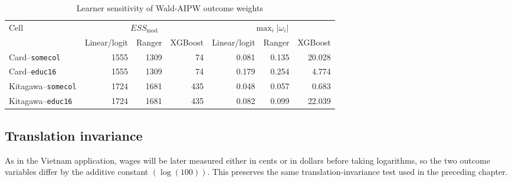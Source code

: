 \documentclass[12pt, a4paper, oneside]{article}
\theoremstyle{plain}
\theoremstyle{definition}
\begin{document}
\begin{table}[htbp]
\centering
\caption{Learner sensitivity of Wald-AIPW outcome weights}
\label{tab:sensitivity_card}
\scriptsize
\setlength{\tabcolsep}{4pt}
\begin{tabular}{lrrrrrr}
\toprule
Cell & \multicolumn{3}{c}{$ESS_{\mathrm{mod}}$} & \multicolumn{3}{c}{$\max_i|\omega_i|$} \\
\cmidrule(lr){2-4}\cmidrule(lr){5-7}
& Linear/logit & Ranger & XGBoost & Linear/logit & Ranger & XGBoost \\
\midrule
Card--\texttt{somecol}     & 1555 & 1309 &  74 & 0.081 & 0.135 & 20.028 \\
Card--\texttt{educ16}      & 1555 & 1309 &  74 & 0.179 & 0.254 &  4.774 \\
Kitagawa--\texttt{somecol} & 1724 & 1681 & 435 & 0.048 & 0.057 &  0.683 \\
Kitagawa--\texttt{educ16}  & 1724 & 1681 & 435 & 0.082 & 0.099 & 22.039 \\
\bottomrule
\end{tabular}

\vspace{4pt}
\end{table}





\newpage


\subsection{Translation invariance }
As in the Vietnam application, wages will be later measured either in cents or in dollars before taking logarithms, so the two outcome variables differ by the additive constant $(\log(100))$. This preserves the same translation-invariance test used in the preceding chapter.
\end{document}
